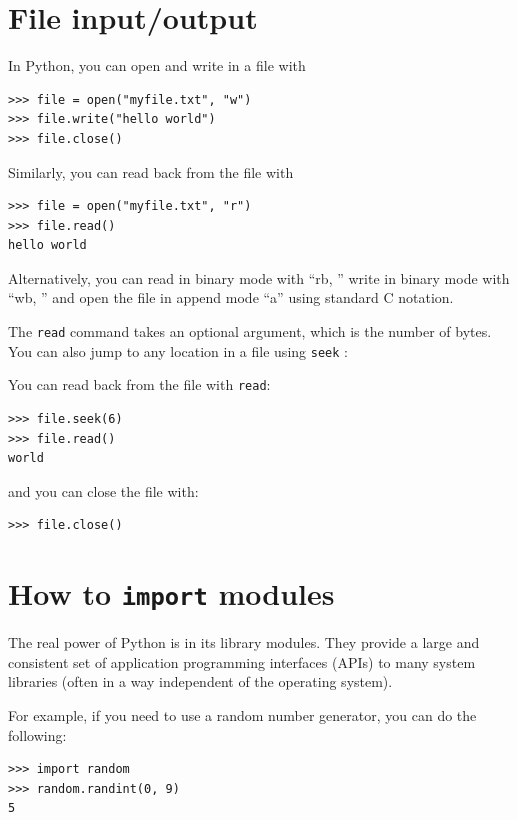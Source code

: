 \documentclass[justified, sixbynine]{tufte-book}
\def\ft{\small\tt}
\theoremstyle{plain}%
\newtheorem * {corollary}{Corollary}
\theoremstyle{definition}
\theoremstyle{remark}
\newtheorem * {remark}{Remark}
\newtheorem * {note}{Note}
\begin{document}
\begin{fullwidth}
\goodbreak\section{File input/output}
 

In Python, you can open and write in a file with
\begin{lstlisting}
>>> file = open("myfile.txt", "w")
>>> file.write("hello world")
>>> file.close()
\end{lstlisting}

Similarly, you can read back from the file with
\begin{lstlisting}
>>> file = open("myfile.txt", "r")
>>> file.read()
hello world
\end{lstlisting}

Alternatively, you can read in binary mode with ``rb, '' write in binary mode with ``wb, '' and open the file in append mode ``a'' using standard C notation.

The {\ft read} command takes an optional argument, which is the number of bytes. You can also jump to any location in a file using {\ft seek}
:

You can read back from the file with {\ft read}:
\begin{lstlisting}
>>> file.seek(6)
>>> file.read()
world
\end{lstlisting}
\noindent and you can close the file with:
\begin{lstlisting}
>>> file.close()
\end{lstlisting}

\goodbreak\section{How to {\ft import} modules}

 
The real power of Python is in its library modules. They provide a large and consistent set of application programming interfaces (APIs) to many system libraries (often in a way independent of the operating system).

For example, if you need to use a random number generator, you can do the following:
\begin{lstlisting}
>>> import random
>>> random.randint(0, 9)
5
\end{lstlisting}


\end{fullwidth}
\end{document}

